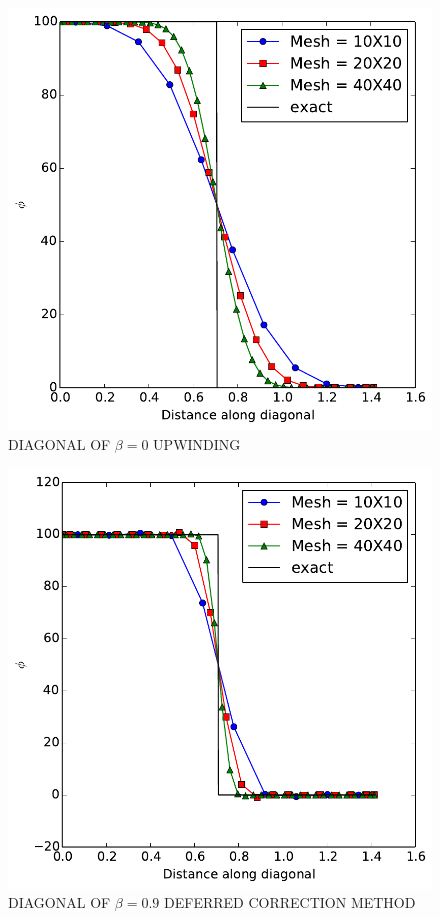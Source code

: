 \documentclass[cleanfoot,cleanhead,twocolumn,10pt,notitlepage]{asme2e}
\begin{document}
\begin{figure}[t]
\begin{center}
    \includegraphics[width=\linewidth]{../Project2_code/Beta/Beta0/lines.pdf}
    \caption{DIAGONAL OF $\beta=0$ UPWINDING}
    \label{fig:be0}
\end{center}
\end{figure}

\begin{figure}[t]
\begin{center}
    \includegraphics[width=\linewidth]{../Project2_code/Beta/Beta0_9/lines.pdf}
    \caption{DIAGONAL OF $\beta=0.9$ DEFERRED CORRECTION METHOD}
    \label{fig:be09}
\end{center}
\end{figure}
\end{document}

